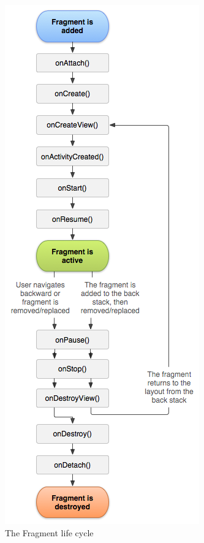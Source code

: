 \begin{figure}
    \includegraphics[width=1.0\linewidth]{images/fragment_lifecycle.png}
   	\caption[The lifecycle of a fragment. \protect{}]{The Fragment life cycle}
   	\label{fig:fragment_lifecycle}
\end{figure}

